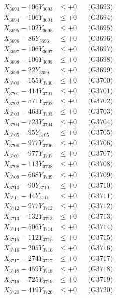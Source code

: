 \documentclass[a4paper,10pt]{article}
\begin{document}
{\begin{align}
X_{3693} - 106Y_{3693} &\leq +0 && \text{(G3693)} \\
X_{3694} - 106Y_{3694} &\leq +0 && \text{(G3694)} \\
X_{3695} - 102Y_{3695} &\leq +0 && \text{(G3695)} \\
X_{3696} - 86Y_{3696} &\leq +0 && \text{(G3696)} \\
X_{3697} - 106Y_{3697} &\leq +0 && \text{(G3697)} \\
X_{3698} - 106Y_{3698} &\leq +0 && \text{(G3698)} \\
X_{3699} - 22Y_{3699} &\leq +0 && \text{(G3699)} \\
X_{3700} - 155Y_{3700} &\leq +0 && \text{(G3700)} \\
\allowbreak
X_{3701} - 414Y_{3701} &\leq +0 && \text{(G3701)} \\
X_{3702} - 571Y_{3702} &\leq +0 && \text{(G3702)} \\
X_{3703} - 463Y_{3703} &\leq +0 && \text{(G3703)} \\
X_{3704} - 723Y_{3704} &\leq +0 && \text{(G3704)} \\
X_{3705} - 95Y_{3705} &\leq +0 && \text{(G3705)} \\
X_{3706} - 977Y_{3706} &\leq +0 && \text{(G3706)} \\
X_{3707} - 977Y_{3707} &\leq +0 && \text{(G3707)} \\
X_{3708} - 113Y_{3708} &\leq +0 && \text{(G3708)} \\
X_{3709} - 668Y_{3709} &\leq +0 && \text{(G3709)} \\
X_{3710} - 90Y_{3710} &\leq +0 && \text{(G3710)} \\
\allowbreak
X_{3711} - 44Y_{3711} &\leq +0 && \text{(G3711)} \\
X_{3712} - 977Y_{3712} &\leq +0 && \text{(G3712)} \\
X_{3713} - 132Y_{3713} &\leq +0 && \text{(G3713)} \\
X_{3714} - 506Y_{3714} &\leq +0 && \text{(G3714)} \\
X_{3715} - 112Y_{3715} &\leq +0 && \text{(G3715)} \\
X_{3716} - 205Y_{3716} &\leq +0 && \text{(G3716)} \\
X_{3717} - 274Y_{3717} &\leq +0 && \text{(G3717)} \\
X_{3718} - 459Y_{3718} &\leq +0 && \text{(G3718)} \\
X_{3719} - 725Y_{3719} &\leq +0 && \text{(G3719)} \\
X_{3720} - 419Y_{3720} &\leq +0 && \text{(G3720)} \\

\end{align}}
\end{document}
